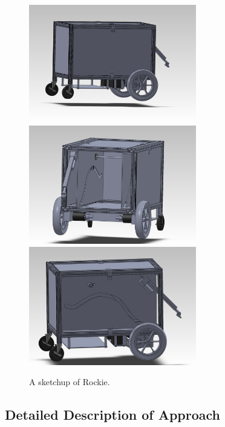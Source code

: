 \documentclass{paper}
\newcommand \robotName{Rockie} 		%
\begin{document}
\begin{figure}[htp]
\centering
\includegraphics[width=0.65\textwidth]{fig/robot_assembly_1.PDF} \\ 
\includegraphics[width=0.65\textwidth]{fig/robot_assembly_2.PDF} \\
\includegraphics[width=0.65\textwidth]{fig/robot_assembly_3.PDF}
\caption{A sketchup of \robotName. }
\label{fig:sketchup}
\end{figure}

\subsection*{Detailed Description of Approach}
\end{document}
